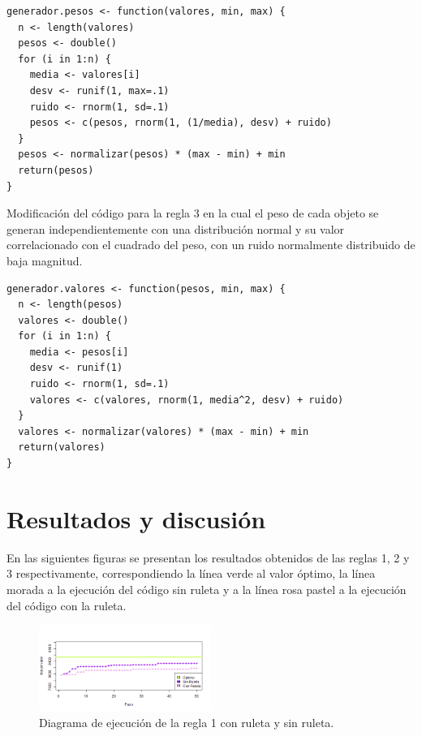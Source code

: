 \documentclass[12pt]{amsart}
\begin{document}
\renewcommand{\listingscaption}{Código}
\begin{listing}[H]
  \begin{verbatim}
generador.pesos <- function(valores, min, max) {
  n <- length(valores)
  pesos <- double()
  for (i in 1:n) {
    media <- valores[i]
    desv <- runif(1, max=.1)
    ruido <- rnorm(1, sd=.1)
    pesos <- c(pesos, rnorm(1, (1/media), desv) + ruido)
  }
  pesos <- normalizar(pesos) * (max - min) + min
  return(pesos)
}
  \end{verbatim}
  \label{codigo1}
\end{listing}

Modificación del código para la regla 3 en la cual el peso de cada objeto se generan independientemente con una distribución normal y su valor correlacionado con el cuadrado del peso, con un ruido normalmente distribuido de baja magnitud.
\renewcommand{\listingscaption}{Código}
\begin{listing}[H]
  \begin{verbatim}
generador.valores <- function(pesos, min, max) {
  n <- length(pesos)
  valores <- double()
  for (i in 1:n) {
    media <- pesos[i]
    desv <- runif(1)
    ruido <- rnorm(1, sd=.1)
    valores <- c(valores, rnorm(1, media^2, desv) + ruido)
  }
  valores <- normalizar(valores) * (max - min) + min
  return(valores)
}
  \end{verbatim}
  \label{codigo1}
\end{listing}

\clearpage
\section{Resultados y discusión}
En las siguientes figuras se presentan los resultados obtenidos de las reglas 1, 2 y 3 respectivamente, correspondiendo la línea verde al valor óptimo, la línea morada a la ejecución del código sin ruleta y a la línea rosa pastel a la ejecución del código con la ruleta.

\begin{figure}[h!]
    \centering
    \includegraphics[width=0.5\textwidth]{t10_1.png}
    \caption{Diagrama de ejecución de la regla 1 con ruleta y sin ruleta.}
    \label{fig1}
\end{figure}
\end{document}
